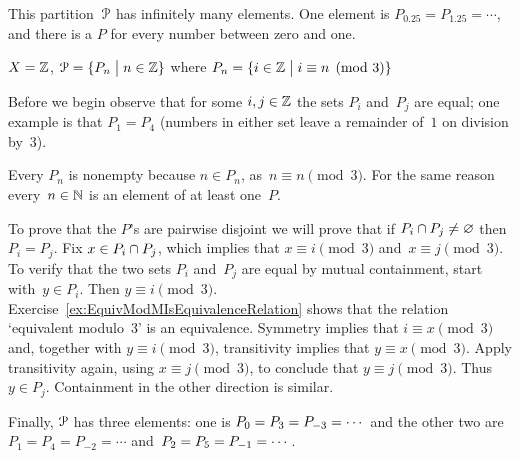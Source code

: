 \documentclass{ibl}  %
\begin{document}
\begin{problem}
\begin{exes}
\begin{answer}
  This partition~$\EuScript{P}$ has infinitely many elements.
  One element is $P_{0.25}=P_{1.25}=\cdots$, and there is a $P$ for every
  number between zero and one.  
\end{answer}
\begin{exercise} 
     $X=\mathbb{Z}$, $\EuScript{P}=\{P_n \bigm| n\in\mathbb{Z}\}$
      where $P_n=\{i\in\mathbb{Z} \bigm| i\equiv n\pmod 3\}$
\end{exercise}
\begin{answer}
  Before we begin observe that 
  for some $i,j\in\mathbb{Z}$ the sets $P_i$ and~$P_j$ are equal;
  one example is that $P_1=P_4$ (numbers in either set leave a remainder 
  of~$1$ on division by~$3$).

  Every $P_n$ is nonempty because $n\in P_n$, as~$n\equiv n\pmod 3$.
  For the same reason every~$n\in\mathbb{N}$ is an element of at least
  one~$P$.

  To prove that the $P$'s are pairwise disjoint
  we will prove that if 
  $P_i\cap P_j\neq \varnothing$ then $P_i=P_j$.
  Fix $x\in P_i\cap P_j$, which implies that
  $x\equiv i\pmod 3$ and~$x\equiv j\pmod 3$.
  To verify that the two sets $P_i$ and~$P_j$ are equal by mutual
  containment, start with~$y\in P_i$.
  Then $y\equiv i\pmod 3$.
  Exercise~\ref{ex:EquivModMIsEquivalenceRelation}
  shows that the relation `equivalent modulo~$3$' is an 
  equivalence.
  Symmetry implies that $i\equiv x\pmod 3$ and, 
  together with $y\equiv i\pmod 3$,
  transitivity implies that $y\equiv x\pmod 3$.
  Apply transitivity again, using $x\equiv j\pmod 3$, to conclude that
  $y\equiv j\pmod 3$. 
  Thus~$y\in P_j$.
  Containment in the other direction is similar.  

  Finally, $\EuScript{P}$ has three elements: 
  one is $P_0=P_3=P_{-3}=\cdots\hbox{}$ and the other two are
  $P_1=P_4=P_{-2}=\cdots{}$ and~$P_2=P_5=P_{-1}=\cdots\hbox{}$.  
\end{answer}
\end{exes}
\end{problem}
\end{document}

